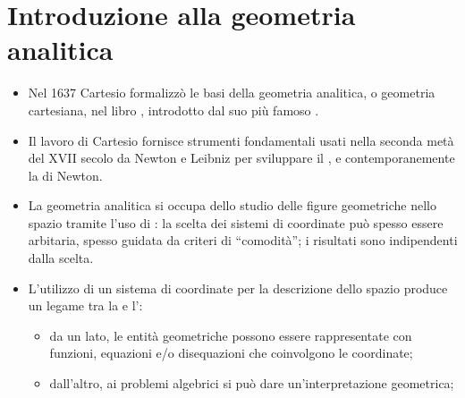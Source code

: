 \documentclass[letterpaper,10pt,english]{jupyterBook}
\begin{document}
\chapter{Introduzione alla geometria analitica}
\label{\detokenize{ch/analytic_geometry:introduzione-alla-geometria-analitica}}\label{\detokenize{ch/analytic_geometry:geometry-analytic}}\label{\detokenize{ch/analytic_geometry::doc}}\begin{itemize}
\item {} 
\sphinxAtStartPar
Nel 1637 Cartesio formalizzò le basi della geometria analitica, o geometria cartesiana, nel libro , introdotto dal suo più famoso .

\item {} 
\sphinxAtStartPar
Il lavoro di Cartesio fornisce strumenti fondamentali usati nella seconda metà del XVII secolo da Newton e Leibniz per sviluppare il {\hyperref[\detokenize{ch/calculus:math-hs-calculus}]{}}, e contemporanemente la  di Newton.

\item {} 
\sphinxAtStartPar
La geometria analitica si occupa dello studio delle figure geometriche nello spazio tramite l’uso di : la scelta dei sistemi di coordinate può spesso essere arbitaria, spesso guidata da criteri di “comodità”; i risultati sono indipendenti dalla scelta.

\item {} 
\sphinxAtStartPar
L’utilizzo di un sistema di coordinate per la descrizione dello spazio produce un legame tra la  e l’:
\begin{itemize}
\item {} 
\sphinxAtStartPar
da un lato, le entità geometriche possono essere rappresentate con funzioni, equazioni e/o disequazioni che coinvolgono le coordinate;

\item {} 
\sphinxAtStartPar
dall’altro, ai problemi algebrici si può dare un’interpretazione geometrica;

\end{itemize}

\end{itemize}
\end{document}
